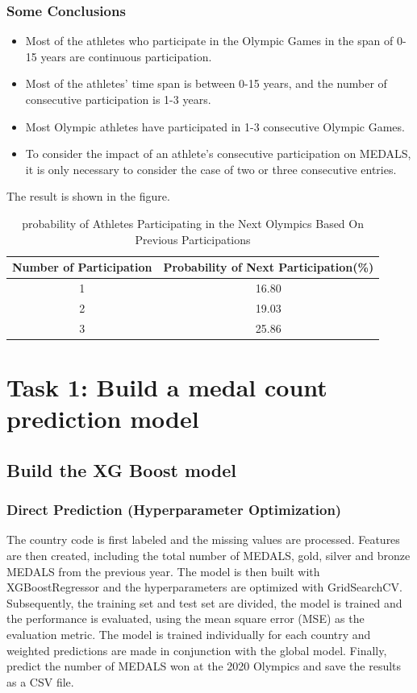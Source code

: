 \documentclass{mcmthesis}
\begin{document}
  \subsubsection{Some Conclusions}
  \begin{itemize}
    \item Most of the athletes who participate in the Olympic Games in the span of 0-15 years are continuous participation.
    \item Most of the athletes' time span is between 0-15 years, and the number of consecutive participation is 1-3 years.
    \item Most Olympic athletes have participated in 1-3 consecutive Olympic Games.
    \item To consider the impact of an athlete's consecutive participation on MEDALS, it is only necessary to consider the case of two or three consecutive entries.
    \end{itemize}
    The result is shown in the figure.
\begin{table}[h!]
  \centering
  \caption{probability of Athletes Participating in the Next Olympics Based On Previous Participations}
   
  \label{tab:olympic participation}
   \begin{tabular}{|c|c|}
    \hline
    \textbf{Number of Participation} & \textbf{Probability of Next Participation(\%)}\\
\hline
1&16.80\\
\hline
2&19.03\\
\hline
3&25.86\\
\hline
   \end{tabular}
  \end{table}
    \section{Task 1: Build a medal count prediction model}
 \subsection{Build the XG Boost model} 
 \subsubsection{Direct Prediction (Hyperparameter Optimization)} 
 The country code is first labeled and the missing values are processed. Features are then created, including the total number of MEDALS, gold, silver and bronze MEDALS from the previous year. The model is then built with XGBoostRegressor and the hyperparameters are optimized with GridSearchCV. Subsequently, the training set and test set are divided, the model is trained and the performance is evaluated, using the mean square error (MSE) as the evaluation metric. The model is trained individually for each country and weighted predictions are made in conjunction with the global model. Finally, predict the number of MEDALS won at the 2020 Olympics and save the results as a CSV file.
\end{document}
